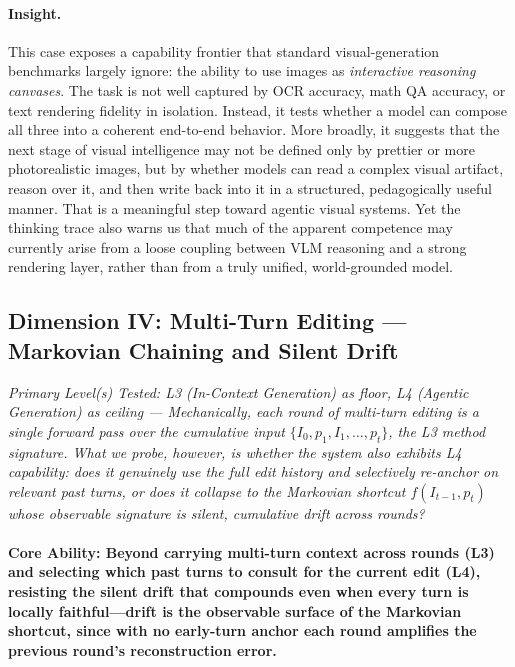 \documentclass{llmxive}
\begin{document}
\paragraph{Insight.}
This case exposes a capability frontier that standard visual-generation benchmarks largely ignore: the ability to use images as \emph{interactive reasoning canvases}. The task is not well captured by OCR accuracy, math QA accuracy, or text rendering fidelity in isolation. Instead, it tests whether a model can compose all three into a coherent end-to-end behavior. More broadly, it suggests that the next stage of visual intelligence may not be defined only by prettier or more photorealistic images, but by whether models can read a complex visual artifact, reason over it, and then write back into it in a structured, pedagogically useful manner. That is a meaningful step toward agentic visual systems. Yet the thinking trace also warns us that much of the apparent competence may currently arise from a loose coupling between VLM reasoning and a strong rendering layer, rather than from a truly unified, world-grounded model.

\subsection{Dimension IV: Multi-Turn Editing --- Markovian Chaining and Silent Drift}

\noindent\textit{Primary Level(s) Tested: L3 (In-Context Generation) as floor, L4 (Agentic Generation) as ceiling --- Mechanically, each round of multi-turn editing is a single forward pass over the cumulative input $\{I_0, p_1, I_1, \ldots, p_t\}$, the L3 method signature. What we probe, however, is whether the system also exhibits L4 capability: does it genuinely use the full edit history and selectively re-anchor on relevant past turns, or does it collapse to the Markovian shortcut $f(I_{t-1}, p_t)$ whose observable signature is silent, cumulative drift across rounds?}

\paragraph{Core Ability: Beyond carrying multi-turn context across rounds (L3) and selecting which past turns to consult for the current edit (L4), resisting the silent drift that compounds even when every turn is locally faithful---drift is the observable surface of the Markovian shortcut, since with no early-turn anchor each round amplifies the previous round's reconstruction error.}
\end{document}
